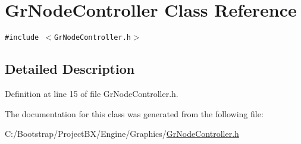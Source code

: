 \hypertarget{class_gr_node_controller}{
\section{GrNodeController Class Reference}
\label{class_gr_node_controller}
}
{\tt \#include $<$GrNodeController.h$>$}



\subsection{Detailed Description}


Definition at line 15 of file GrNodeController.h.

The documentation for this class was generated from the following file:\begin{CompactItemize}
\item 
C:/Bootstrap/ProjectBX/Engine/Graphics/\hyperlink{_gr_node_controller_8h}{GrNodeController.h}\end{CompactItemize}
